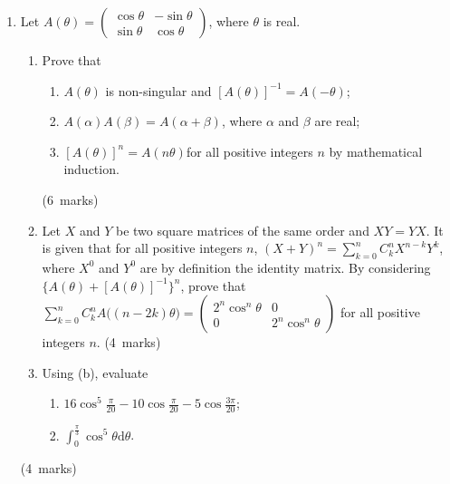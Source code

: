 \documentclass[12pt, a4paper]{article} %
\newcommand{\qmarks}[1]{\leavevmode\unskip\hspace*{\fill}\mbox{(#1 marks)}}
\begin{document}
\begin{enumerate}
    \item Let \(A(\theta)=\begin{pmatrix}
        \cos\theta & -\sin\theta\\
        \sin\theta & \cos\theta
    \end{pmatrix}\), where \(\theta\) is real.
    \begin{enumerate}
        \item Prove that
            \begin{enumerate}[label=(\roman*)]
                \item \(A(\theta)\) is non-singular and \([A(\theta)]^{-1}=A(-\theta)\);
                \item \(A(\alpha)A(\beta)=A(\alpha+\beta)\), where \(\alpha\) and \(\beta\) are real;
                \item \([A(\theta)]^n=A(n\theta)\)for all positive integers \(n\) by mathematical induction.
            \end{enumerate}\qmarks{6}
        \item Let \(X\) and \(Y\) be two square matrices of the same order and \(XY=YX\). It is given that for all positive integers \(n\), \(\displaystyle (X+Y)^n=\sum_{k=0}^nC_k^nX^{n-k}Y^k\), where \(X^0\) and \(Y^0\) are by definition the identity matrix. By considering \( \lbrace A(\theta)+[A(\theta)]^{-1} \rbrace^n\), prove that \(\displaystyle \sum_{k=0}^nC_k^nA\big((n-2k)\theta\big)=\begin{pmatrix}
            2^n\cos^n\theta & 0\\
            0 & 2^n\cos^n\theta
        \end{pmatrix}\) for all positive integers \(n\). \qmarks{4}
        \item Using (b), evaluate 
        \begin{enumerate}[label=(\roman*)]
            \item \(\displaystyle 16\cos^5\frac{\pi}{20}-10\cos\frac{\pi}{20}-5\cos\frac{3\pi}{20}\);
            \item \(\displaystyle \int_0^{\frac{\pi}{3}}\cos^5\theta \mathrm{d}\theta\).
        \end{enumerate}
    \end{enumerate}\qmarks{4}
\end{enumerate}
\newpage
\end{document}
